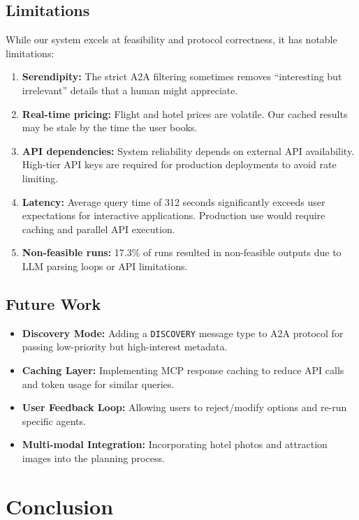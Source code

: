 \documentclass[conference]{IEEEtran}
\begin{document}
\subsection{Limitations}
While our system excels at feasibility and protocol correctness, it has notable limitations:
\begin{enumerate}
    \item \textbf{Serendipity:} The strict A2A filtering sometimes removes ``interesting but irrelevant'' details that a human might appreciate.
    \item \textbf{Real-time pricing:} Flight and hotel prices are volatile. Our cached results may be stale by the time the user books.
    \item \textbf{API dependencies:} System reliability depends on external API availability. High-tier API keys are required for production deployments to avoid rate limiting.
    \item \textbf{Latency:} Average query time of 312 seconds significantly exceeds user expectations for interactive applications. Production use would require caching and parallel API execution.
    \item \textbf{Non-feasible runs:} 17.3\% of runs resulted in non-feasible outputs due to LLM parsing loops or API limitations.
\end{enumerate}

\subsection{Future Work}
\begin{itemize}
    \item \textbf{Discovery Mode:} Adding a \texttt{DISCOVERY} message type to A2A protocol for passing low-priority but high-interest metadata.
    \item \textbf{Caching Layer:} Implementing MCP response caching to reduce API calls and token usage for similar queries.
    \item \textbf{User Feedback Loop:} Allowing users to reject/modify options and re-run specific agents.
    \item \textbf{Multi-modal Integration:} Incorporating hotel photos and attraction images into the planning process.
\end{itemize}

\section{Conclusion}
\end{document}
